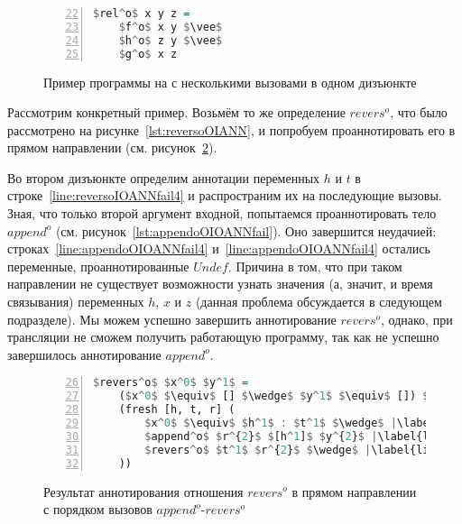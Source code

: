 \begin{figure}[h!]
  \begin{center}
  \begin{minipage}{0.18\textwidth}
  \begin{lstlisting}[language=Haskell, frame=single, numbers=left,numberstyle=\small, firstnumber=22, escapechar=|]
  $rel^o$ x y z =
    $f^o$ x y $\vee$
    $h^o$ z y $\vee$
    $g^o$ x z
    \end{lstlisting}
  \end{minipage}
  \end{center}
  \caption{Пример программы на \miniKanren{} с несколькими вызовами в одном дизъюнкте}
  \label{lst:reloDEF}
\end{figure}

Рассмотрим конкретный пример.
Возьмём то же определение $revers^o$, что было рассмотрено на рисунке~\ref{lst:reversoOIANN}, и попробуем проаннотировать его в прямом направлении (см. рисунок~\ref{lst:reversoIOANNfail}).

Во втором дизъюнкте определим аннотации переменных $h$ и $t$ в строке~\ref{line:reversoIOANNfail4} и распространим их на последующие вызовы.
Зная, что только второй аргумент входной, попытаемся проаннотировать тело $append^o$ (см. рисунок~\ref{lst:appendoOIOANNfail}).
Оно завершится неудачией: строках~\ref{line:appendoOIOANNfail4} и~\ref{line:appendoOIOANNfail4} остались переменные, проаннотированные $Undef$.
Причина в том, что при таком направлении не существует возможности узнать значения (а, значит, и время связывания) переменных $h$, $x$ и $z$ (данная проблема обсуждается в следующем подразделе).
Мы можем успешно завершить аннотирование $revers^o$, однако, при трансляции не сможем получить работающую программу, так как не успешно завершилось аннотирование $append^o$. 

\begin{figure}[h!]
  \begin{center}
  \begin{minipage}{0.4\textwidth}
  \begin{lstlisting}[language=Haskell, frame=single, numbers=left,numberstyle=\small, firstnumber=26, escapechar=|]
  $revers^o$ $x^0$ $y^1$ =
    ($x^0$ $\equiv$ [] $\wedge$ $y^1$ $\equiv$ []) $\vee$ |\label{line:reversoIOANNfail2}|
    (fresh [h, t, r] (
        $x^0$ $\equiv$ $h^1$ : $t^1$ $\wedge$ |\label{line:reversoIOANNfail4}|
        $append^o$ $r^{2}$ $[h^1]$ $y^{2}$ |\label{line:reversoIOANNfail5}|
        $revers^o$ $t^1$ $r^{2}$ $\wedge$ |\label{line:reversoIOANNfail6}|
    ))
    \end{lstlisting}
  \end{minipage}
  \end{center}
  \caption{Результат аннотирования отношения $revers^o$ в прямом направлении с порядком вызовов $append^o$-$revers^o$}
  \label{lst:reversoIOANNfail}
\end{figure}

